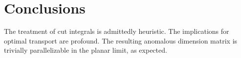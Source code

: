 \section{Conclusions}\label{sec:conclusions}

The treatment of cut integrals is admittedly heuristic. The implications
for optimal transport are profound. The resulting anomalous dimension
matrix is trivially parallelizable in the planar limit, as expected.

